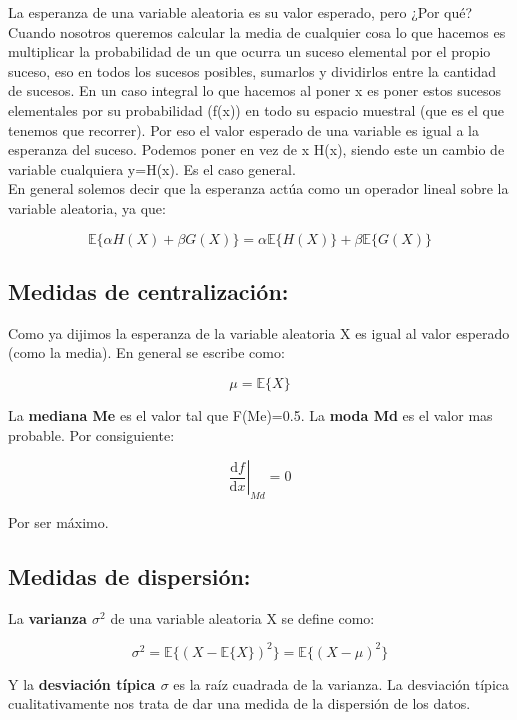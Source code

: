 \documentclass[12pt,a4paper]{book}
\newcommand{\D}{\mathrm{d}}
\newcommand{\E}{\mathbb{E}}
\newcommand{\corchetes}[1]{\{ #1 \}}
\begin{document}
La esperanza de una variable aleatoria es su valor esperado, pero ¿Por qué? Cuando nosotros queremos calcular la media de cualquier cosa lo que hacemos es multiplicar la probabilidad de un que ocurra un suceso elemental por el propio suceso, eso en todos los sucesos posibles, sumarlos y dividirlos entre la cantidad de sucesos. En un caso integral lo que hacemos al poner x es poner estos sucesos elementales por su probabilidad (f(x)) en todo su espacio muestral (que es el que tenemos que recorrer). Por eso el valor esperado de una variable es igual a la esperanza del suceso. Podemos poner en vez de x H(x), siendo este un cambio de variable cualquiera y=H(x). Es el caso general. \\

En general solemos decir que la esperanza actúa como un operador lineal sobre la variable aleatoria, ya que:

$$ \E \{ \alpha H(X) + \beta G(X) \} = \alpha \E \lbrace H(X) \rbrace + \beta \E \lbrace G(X) \rbrace $$

\subsection{Medidas de centralización:}
Como ya dijimos la esperanza de la variable aleatoria X es igual al valor esperado (como la media). En general se escribe como:

\begin{equation}
\mu = \E \lbrace X \rbrace
\end{equation}

La \textbf{mediana Me} es el valor tal que F(Me)=0.5. La \textbf{moda Md} es el valor mas probable. Por consiguiente: 

$$ \left.  \dfrac{\D f}{\D x} \right|_{Md}  = 0$$ 

Por ser máximo. 

\subsection{Medidas de dispersión:}
La \textbf{varianza $\sigma^2$} de una variable aleatoria X se define como:

\begin{equation}
\sigma^2 = \E \corchetes{(X-\E \corchetes{X})^2} = \E  \corchetes {(X - \mu)^2}
\end{equation}

Y la  \textbf{desviación típica $\sigma$} es la raíz cuadrada de la varianza. La desviación típica cualitativamente nos trata de dar una medida de la dispersión de los datos. 
\end{document}
